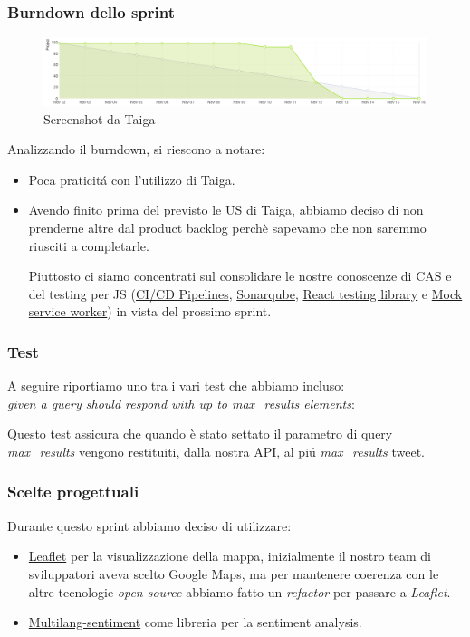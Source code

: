 \documentclass{article}
\begin{document}
\subsubsection{Burndown dello sprint}
\begin{figure}[H]
    \centering
    \includegraphics[scale=0.22]{burdowns/sprint2.png}
    \caption{Screenshot da Taiga}
    \label{fig:burndown2}
\end{figure}
Analizzando il burndown, si riescono a notare:
\begin{itemize}
    \item Poca praticit\'a con l'utilizzo di Taiga.
    \item Avendo finito prima del previsto le US di Taiga, abbiamo deciso di non prenderne altre dal product backlog perch\`e sapevamo che non saremmo riusciti a completarle.
    
    Piuttosto ci siamo concentrati sul consolidare le nostre conoscenze di CAS e del testing per JS (\href{https://docs.gitlab.com/ee/ci/pipelines/}{CI/CD Pipelines}, \href{https://docs.sonarqube.org/latest/}{Sonarqube}, \href{https://testing-library.com/docs/react-testing-library/intro/}{React testing library} e \href{https://mswjs.io/docs/api/response}{Mock service worker}) in vista del prossimo sprint.
\end{itemize}
\subsubsection{Test}
A seguire riportiamo uno tra i vari test che abbiamo incluso: \\
\textit{given a query should respond with up to max\_results elements}:

Questo test assicura che quando \`e stato settato il parametro di query \textit{max\_results} vengono restituiti, dalla nostra API, al pi\'u \textit{max\_results} tweet.

\subsubsection{Scelte progettuali}
Durante questo sprint abbiamo deciso di utilizzare:
\begin{itemize}
    \item \href{https://leafletjs.com/}{Leaflet} per la visualizzazione della mappa, inizialmente il nostro team di sviluppatori aveva scelto Google Maps, ma per mantenere coerenza con le altre tecnologie \textit{open source} abbiamo fatto un \textit{refactor} per passare a \textit{Leaflet}.
    \item \href{https://www.npmjs.com/package/multilang-sentiment}{Multilang-sentiment} come libreria per la sentiment analysis.
\end{itemize}
\end{document}
